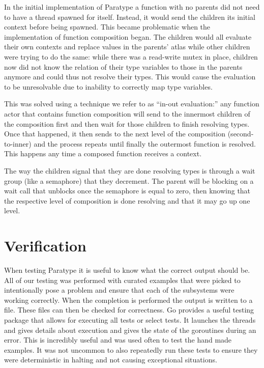 \documentclass{acm_proc_article-sp}
\begin{document}
		In the initial implementation of Paratype a function with no parents
		did not need to have a thread spawned for itself. Instead, it would
		send the children its initial context before being spawned. This became
		problematic when the implementation of function composition began. The
		children would all evaluate their own contexts and replace values in
		the parents' atlas while other children were trying to do the same:
		while there was a read-write mutex in place, children now did not know
		the relation of their type variables to those in the parents anymore
		and could thus not resolve their types. This would cause the evaluation
		to be unresolvable due to inability to correctly map type variables. 

		This was solved using a technique we refer to as ``in-out evaluation:''
		any function actor that contains function composition will send to the
		innermost children of the composition first and then wait for those
		children to finish resolving types. Once that happened, it then sends
		to the next level of the composition (second-to-inner) and the process
		repeats until finally the outermost function is resolved. This happens
		any time a composed function receives a context.

		The way the children signal that they are done resolving types is
		through a wait group (like a semaphore) that they decrement. The parent
		will be blocking on a wait call that unblocks once the semaphore is
		equal to zero, then knowing that the respective level of composition is
		done resolving and that it may go up one level.

\section{Verification}
	When testing Paratype it is useful to know what the correct output should
	be. All of our testing was performed with curated examples that were picked
	to intentionally pose a problem and ensure that each of the subsystems were
	working correctly. When the completion is performed the output is written
	to a file. These files can then be checked for correctness. Go provides a
	useful testing package that allows for executing all tests or select tests.
	It launches the threads and gives details about execution and gives the
	state of the goroutines during an error. This is incredibly useful and was
	used often to test the hand made examples. It was not uncommon to also
	repeatedly run these tests to ensure they were deterministic in halting and
	not causing exceptional situations.  
	
\end{document}
